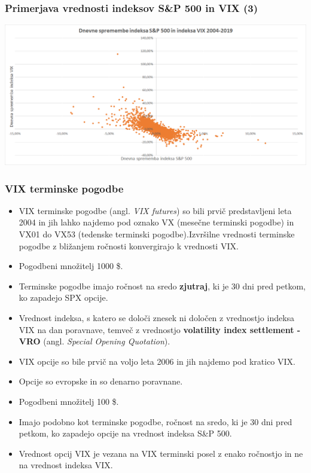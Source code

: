 \documentclass[10pt]{beamer}
\begin{document}
\begin{frame}
\frametitle{Primerjava vrednosti indeksov S\&P 500 in VIX (3)}
\includegraphics[width=1\textwidth]{./Grafi/VIX_scatter.png}
\end{frame}


\begin{frame}
\frametitle{VIX terminske pogodbe}
\begin{itemize}
\item VIX terminske pogodbe (angl. \textit{VIX futures}) so bili prvič predstavljeni leta 2004 in jih lahko najdemo pod oznako VX (mesečne terminski pogodbe) in VX01 do VX53 (tedenske terminski pogodbe).Izvršilne vrednosti terminske pogodbe z bližanjem ročnosti konvergirajo k vrednosti VIX.
\item Pogodbeni množitelj 1000 \$.
\item Terminske pogodbe imajo ročnost na sredo \textbf{zjutraj}, ki je 30 dni pred petkom, ko zapadejo SPX opcije.
\item Vrednost indeksa, s katero se določi znesek ni določen z vrednostjo indeksa VIX na dan poravnave, temveč z vrednostjo \textbf{volatility index settlement - VRO} (angl. \textit{Special Opening Quotation}). 


\end{itemize}
\end{frame}


\begin{frame}
\begin{itemize}
\frametitle{Opcije na vrednost indeksa VIX}
\item VIX opcije so bile prvič na voljo leta 2006 in jih najdemo pod kratico VIX.
\item  Opcije so evropske in so denarno poravnane.
\item Pogodbeni množitelj 100 \$.
\item Imajo podobno kot terminske pogodbe, ročnost na sredo, ki je 30 dni pred petkom, ko zapadejo opcije na vrednost indeksa S\&P 500.
\item Vrednost opcij VIX je vezana na VIX terminski posel z enako ročnostjo in ne na vrednost indeksa VIX.


\end{itemize}

\end{frame}
\end{document}
